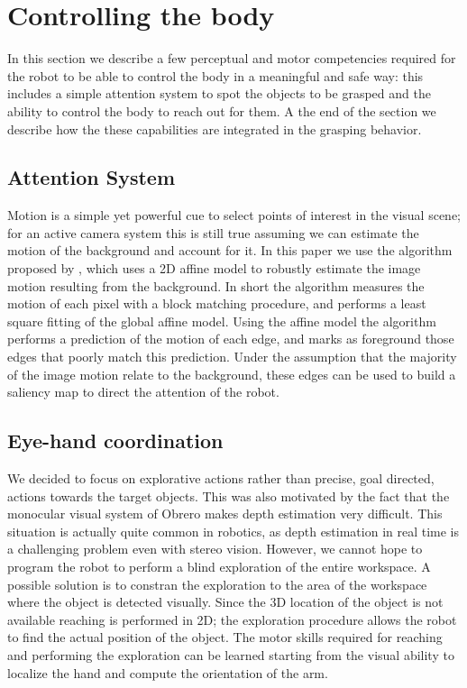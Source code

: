 \section{Controlling the body}
\label{sec:controlling}
%
In this section we describe a few perceptual and motor competencies required
for the robot to be able to control the body in a meaningful and safe way:
this includes a simple attention system to spot the objects to be grasped
and the ability to control the body to reach out for them. A the end of the
section we describe how the these capabilities are integrated in the grasping
behavior.
%
\subsection{Attention System}
Motion is a simple yet powerful cue to select points of interest
in the visual scene; for an active camera system this is still
true assuming we can estimate the motion of the background and
account for it. In this paper we use the algorithm proposed by
\cite{kemp-thesis}, which uses a 2D affine model to robustly
estimate the image motion resulting from the background. In short
the algorithm measures the motion of each pixel with a block
matching procedure, and performs a least square fitting of the
global affine model. Using the affine model the algorithm performs
a prediction of the motion of each edge, and marks as foreground
those edges that poorly match this prediction. Under the
assumption that the majority of the image motion relate to the
background, these edges can be used to build a saliency map to
direct the attention of the robot.
%
\subsection{Eye-hand coordination}
We decided to focus on explorative
actions rather than precise, goal directed, actions towards the target objects.
This was also motivated by the fact that the monocular visual system of Obrero
makes depth estimation very difficult. This situation is actually quite common
in robotics, as depth estimation in real time is a challenging problem even with
stereo vision.
However, we cannot hope to program the robot to perform
a blind exploration of the entire workspace. A possible solution is to
constran the exploration to the area of the workspace where the object is
detected visually. Since the 3D location of the object is not available reaching
is performed in 2D; the exploration procedure allows the robot to find the actual
position of the object. The motor skills required for reaching and performing
the exploration can be learned starting from the visual ability
to localize the hand and compute the orientation of the arm.
%
